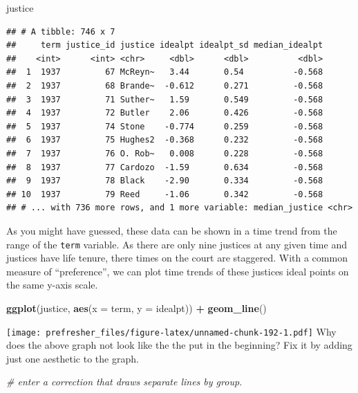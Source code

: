 \documentclass[]{book}
\newenvironment{Shaded}{\begin{snugshade}}{\end{snugshade}}
\newcommand{\CommentTok}[1]{\textcolor[rgb]{0.56,0.35,0.01}{\textit{#1}}}
\newcommand{\DataTypeTok}[1]{\textcolor[rgb]{0.13,0.29,0.53}{#1}}
\newcommand{\KeywordTok}[1]{\textcolor[rgb]{0.13,0.29,0.53}{\textbf{#1}}}
\newcommand{\NormalTok}[1]{#1}
\newcommand{\OperatorTok}[1]{\textcolor[rgb]{0.81,0.36,0.00}{\textbf{#1}}}
\newcommand{\StringTok}[1]{\textcolor[rgb]{0.31,0.60,0.02}{#1}}
\theoremstyle{definition}
\theoremstyle{definition}
\theoremstyle{definition}
\theoremstyle{remark}
\begin{document}
\begin{Shaded}
\begin{Highlighting}[]
\begin{Shaded}
\begin{Highlighting}[]
\begin{Shaded}
\begin{Highlighting}[]
\begin{Shaded}
\begin{Highlighting}[]
\NormalTok{justice}
\end{Highlighting}
\end{Shaded}

\begin{verbatim}
## # A tibble: 746 x 7
##     term justice_id justice idealpt idealpt_sd median_idealpt
##    <int>      <int> <chr>     <dbl>      <dbl>          <dbl>
##  1  1937         67 McReyn~   3.44       0.54          -0.568
##  2  1937         68 Brande~  -0.612      0.271         -0.568
##  3  1937         71 Suther~   1.59       0.549         -0.568
##  4  1937         72 Butler    2.06       0.426         -0.568
##  5  1937         74 Stone    -0.774      0.259         -0.568
##  6  1937         75 Hughes2  -0.368      0.232         -0.568
##  7  1937         76 O. Rob~   0.008      0.228         -0.568
##  8  1937         77 Cardozo  -1.59       0.634         -0.568
##  9  1937         78 Black    -2.90       0.334         -0.568
## 10  1937         79 Reed     -1.06       0.342         -0.568
## # ... with 736 more rows, and 1 more variable: median_justice <chr>
\end{verbatim}

As you might have guessed, these data can be shown in a time trend from the range of the \texttt{term} variable. As there are only nine justices at any given time and justices have life tenure, there times on the court are staggered. With a common measure of ``preference'', we can plot time trends of these justices ideal points on the same y-axis scale.

\begin{Shaded}
\begin{Highlighting}[]
\KeywordTok{ggplot}\NormalTok{(justice, }\KeywordTok{aes}\NormalTok{(}\DataTypeTok{x =}\NormalTok{ term, }\DataTypeTok{y =}\NormalTok{ idealpt)) }\OperatorTok{+}
\StringTok{  }\KeywordTok{geom_line}\NormalTok{()}
\end{Highlighting}
\end{Shaded}

\texttt{[image: prefresher\_files/figure-latex/unnamed-chunk-192-1.pdf]}
Why does the above graph not look like the the put in the beginning? Fix it by adding just one aesthetic to the graph.

\begin{Shaded}
\begin{Highlighting}[]
\CommentTok{# enter a correction that draws separate lines by group.}
\end{Highlighting}
\end{Shaded}


\end{Highlighting}
\end{Shaded}
\end{Highlighting}
\end{Shaded}
\end{Highlighting}
\end{Shaded}
\end{document}
